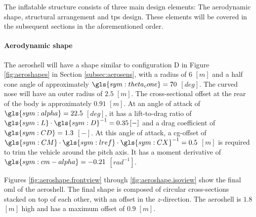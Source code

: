 The inflatable structure consists of three main design elements: The aerodynamic shape, structural arrangement and \gls{tps} design. These elements will be covered in the subsequent sections in the aforementioned order.

\paragraph{Aerodynamic shape}
The aeroshell will have a shape similar to configuration D in Figure \ref{fig:aeroshapes} in Section \ref{subsec:aerosens}, with a radius of $6$ $\left[m\right]$ and a half cone angle of approximately $\gls{sym:theta_cone} = 70$ $\left[deg\right]$. The curved nose will have an outer radius of $2.5$ $\left[m\right]$. The cross-sectional offset at the rear of the body is approximately $0.91$ $\left[m\right]$. At an angle of attack of $\gls{sym:alpha} = 22.5$ $\left[deg\right]$, it has a lift-to-drag ratio of $\gls{sym:L} \cdot \gls{sym:D}^{-1} = 0.35\left[-\right]$ and a drag coefficient of $\gls{sym:CD} = 1.3$ $\left[-\right]$. At this angle of attack, a \gls{cg}-offset of $\gls{sym:CM}\cdot \gls{sym:lref} \cdot \gls{sym:CX}^{-1} = 0.5$ $\left[m\right]$ is required to trim the vehicle around the pitch axis. It has a moment derivative of $\gls{sym:cm-alpha} = -0.21$ $\left[rad^{-1}\right]$. 

 Figures \ref{fig:aeroshape.frontview} through \ref{fig:aeroshape.isoview} show the final \gls{oml} of the aeroshell. The final shape is composed of circular cross-sections stacked on top of each other, with an offset in the $z$-direction. The aeroshell is $1.8$ $\left[m\right]$ high and has a maximum offset of $0.9$ $\left[m\right]$.
 
